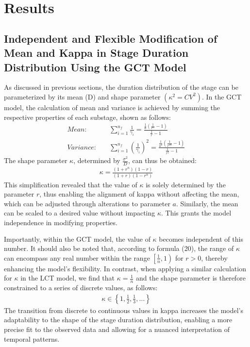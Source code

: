 \documentclass[12pt]{article}
\begin{document}
\section{Results}
\subsection{Independent and Flexible Modification of Mean and Kappa in Stage Duration Distribution Using the GCT Model}
\label{parm result}
As discussed in previous sections, the duration distribution of the stage can be parameterized by its mean (D) and shape parameter $(\kappa^2 = CV^2)$. In the GCT model, the calculation of mean and variance is achieved by summing the respective properties of each substage, shown as follows:
\begin{align}
    Mean: \quad  &\sum_{i=1}^{n_f} \frac{1}{\gamma_i} = \frac{\frac{1}{a} (\frac{1}{r^n} - 1)}{\frac{1}{r} -1} \\
    Variance: \quad &\sum_{i=1}^{n_f} \left(\frac{1}{\gamma_i} \right)^2 = \frac{\frac{1}{a^2} (\frac{1}{r^{2n}} - 1)}{\frac{1}{r^2} -1}
\end{align}
The shape parameter $\kappa$, determined by $\frac{\sigma^2}{D}$, can thus be obtained:
\begin{align}
    \kappa = \frac{(1+r^{n}) (1-r)}{(1+r) (1-r^{n})}
\end{align}
This simplification revealed that the value of $\kappa$ is solely determined by the parameter $r$, thus enabling the alignment of kappa without affecting the mean, which can be adjusted through alterations to parameter $a$. Similarly, the mean can be scaled to a desired value without impacting $\kappa$. This grants the model independence in modifying properties.

Importantly, within the GCT model, the value of $\kappa$ becomes independent of this number. It should also be noted that, according to formula (20), the range of $\kappa$ can encompass any real number within the range $\left[ \frac{1}{n}, 1 \right)$ for $r > 0$, thereby enhancing the model's flexibility. In contrast, when applying a similar calculation for $\kappa$ in the LCT model, we find that $\kappa = \frac{1}{n}$ and the shape parameter is therefore constrained to a series of discrete values, as follows:
\begin{align*}
    \kappa \in \left\{ 1, \frac{1}{2}, \frac{1}{3}, \dots \right\}
\end{align*}
The transition from discrete to continuous values in kappa increases the model's adaptability to the shape of the stage duration distribution, enabling a more precise fit to the observed data and allowing for a nuanced interpretation of temporal patterns.
\end{document}
